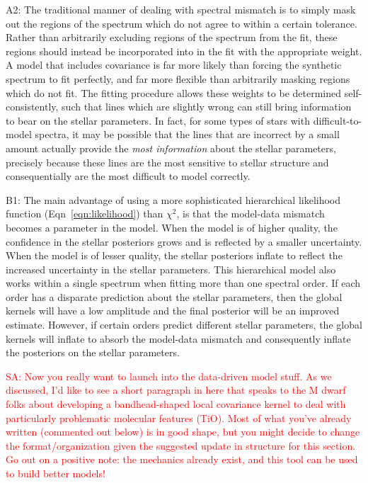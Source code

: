 \documentclass[iop,floatfix]{emulateapj}
\newcommand{\comm}[1]{ \textcolor{red}{SA: #1}}
\begin{document}
A2: The traditional manner of dealing with spectral mismatch is to simply mask out the regions of the spectrum which do not agree to within a certain tolerance. Rather than arbitrarily excluding regions of the spectrum from the fit, these regions should instead be incorporated into in the fit with the appropriate weight. A model that includes covariance is far more likely than forcing the synthetic spectrum to fit perfectly, and far more flexible than arbitrarily masking regions which do not fit. The fitting procedure allows these weights to be determined self-consistently, such that lines which are slightly wrong can still bring information to bear on the stellar parameters. In fact, for some types of stars with difficult-to-model spectra, it may be possible that the lines that are incorrect by a small amount actually provide the \emph{most information} about the stellar parameters, precisely because these lines are the most sensitive to stellar structure and consequentially are the most difficult to model correctly.

B1: The main advantage of using a more sophisticated hierarchical likelihood function (Eqn~\ref{eqn:likelihood}) than $\chi^2$, is that the model-data mismatch becomes a parameter in the model. When the model is of higher quality, the confidence in the stellar posteriors grows and is reflected by a smaller uncertainty. When the model is of lesser quality, the stellar posteriors inflate to reflect the increased uncertainty in the stellar parameters. This hierarchical model also works within a single spectrum when fitting more than one spectral order. If each order has a disparate prediction about the stellar parameters, then the global kernels will have a low amplitude and the final posterior will be an improved estimate. However, if certain orders predict different stellar parameters, the global kernels will inflate to absorb the model-data mismatch and consequently inflate the posteriors on the stellar parameters.

\comm{Now you really want to launch into the data-driven model stuff.  As we discussed, I'd like to 
see a short paragraph in here that speaks to the M dwarf folks about developing a bandhead-shaped 
local covariance kernel to deal with particularly problematic molecular features (TiO).  Most of 
what you've already written (commented out below) is in good shape, but you might decide to change 
the format/organization given the suggested update in structure for this section.  Go out on a 
positive note: the mechanics already exist, and this tool can be used to build better models!}
\end{document}
